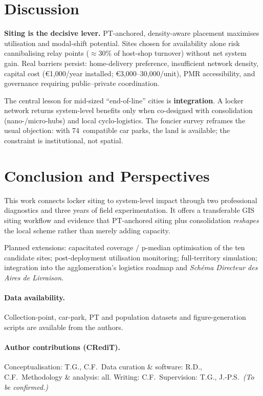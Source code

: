 \documentclass[10pt,a4paper,twocolumn]{article}
\begin{document}
\section{Discussion}

\textbf{Siting is the decisive lever.} PT-anchored, density-aware placement
maximises utilisation and modal-shift potential. Sites chosen for availability alone
risk cannibalising relay points ($\approx$30\% of host-shop turnover) without net
system gain. Real barriers persist: home-delivery preference, insufficient network
density, capital cost (\euro{}1,000/year installed; \euro{}3,000--30,000/unit),
PMR accessibility, and governance requiring public--private coordination.

The central lesson for mid-sized ``end-of-line'' cities is \textbf{integration}.
A locker network returns system-level benefits only when co-designed with
consolidation (nano-/micro-hubs) and local cyclo-logistics. The foncier survey
reframes the usual objection: with 74~compatible car parks, the land is available;
the constraint is institutional, not spatial.

\section{Conclusion and Perspectives}

This work connects locker siting to system-level impact through two professional
diagnostics and three years of field experimentation. It offers a transferable GIS
siting workflow and evidence that PT-anchored siting plus consolidation
\emph{reshapes} the local scheme rather than merely adding capacity.

Planned extensions: capacitated coverage / p-median optimisation of the ten
candidate sites; post-deployment utilisation monitoring; full-territory simulation;
integration into the agglomeration's logistics roadmap and \textit{Schéma Directeur
des Aires de Livraison}.

\paragraph{Data availability.} Collection-point, car-park, PT and population
datasets and figure-generation scripts are available from the authors.

\paragraph{Author contributions (CRediT).} Conceptualisation: T.G., C.F.\ Data
curation \& software: R.D., C.F.\ Methodology \& analysis: all. Writing: C.F.\
Supervision: T.G., J.-P.S.\ \textit{(To be confirmed.)}
\end{document}
